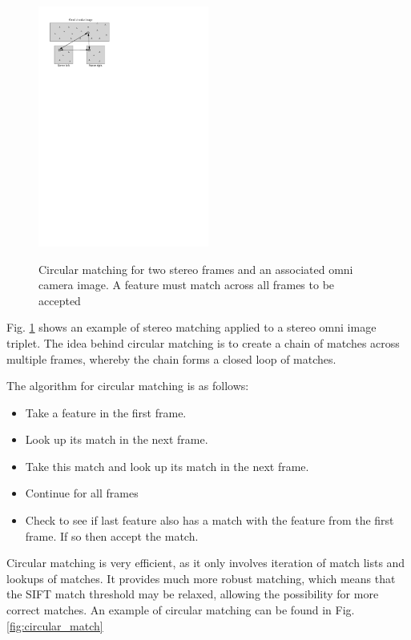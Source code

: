 \begin{figure}[h]
  \centering
    \includegraphics[width=0.5\textwidth]{chapters/images/triangle_circular_matching}\\
  \caption{Circular matching for two stereo frames and an associated omni camera image. A feature must match across all frames to be accepted}
  \label{fig:stereo_circular_matching}
\end{figure}

Fig. \ref{fig:stereo_circular_matching} shows an example of stereo matching applied to  a stereo omni image triplet.  The idea behind circular matching is to create a chain of matches across multiple frames, whereby the chain forms a closed loop of matches. 

The algorithm for circular matching is as follows:  
\begin{itemize} \itemsep1pt  \parskip0pt 
 \item Take a feature in the first frame.  
 \item Look up its match in the next frame.  
 \item Take this match and look up its match in the next frame.  
 \item Continue for all frames
 \item Check to see if last feature also has a match with the feature from the first frame.  
 \subitem If so then accept the match.
\end{itemize}

Circular matching is very efficient, as it only involves iteration of match lists and lookups of matches.  It provides much more robust matching, which means that the SIFT match threshold may be relaxed, allowing the possibility for more correct matches. An example of circular matching can be found in Fig. \ref{fig:circular_match} 

